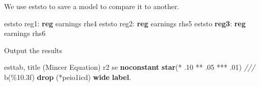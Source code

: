 \documentclass[
]{book}
\newenvironment{Shaded}{\begin{snugshade}}{\end{snugshade}}
\newcommand{\BaseNTok}[1]{\textcolor[rgb]{0.00,0.00,0.81}{#1}}
\newcommand{\CommentTok}[1]{\textcolor[rgb]{0.56,0.35,0.01}{\textit{#1}}}
\newcommand{\KeywordTok}[1]{\textcolor[rgb]{0.13,0.29,0.53}{\textbf{#1}}}
\newcommand{\NormalTok}[1]{#1}
\newcommand{\OtherTok}[1]{\textcolor[rgb]{0.56,0.35,0.01}{#1}}
\begin{document}
We use eststo to save a model to compare it to another.

\begin{Shaded}
\begin{Highlighting}[]
\NormalTok{eststo reg1: }\KeywordTok{reg}\NormalTok{ earnings }\OtherTok{\textasciigrave{}rhs4\textquotesingle{}}
\NormalTok{eststo reg2: }\KeywordTok{reg}\NormalTok{ earnings }\OtherTok{\textasciigrave{}rhs5\textquotesingle{}}
\NormalTok{eststo }\KeywordTok{reg3}\NormalTok{: }\KeywordTok{reg}\NormalTok{ earnings }\OtherTok{\textasciigrave{}rhs6\textquotesingle{}}
\end{Highlighting}
\end{Shaded}

Output the results

\begin{Shaded}
\begin{Highlighting}[]
\NormalTok{esttab, }\BaseNTok{title}\NormalTok{ (Mincer Equation) r2 se }\KeywordTok{noconstant} \KeywordTok{star}\NormalTok{(* .10 ** .05 *** .01) }\CommentTok{///}
\NormalTok{b(\%10.3f) }\KeywordTok{drop}\NormalTok{ (*peio1icd) }\KeywordTok{wide} \KeywordTok{label}\NormalTok{.}
\end{Highlighting}
\end{Shaded}
\end{document}
